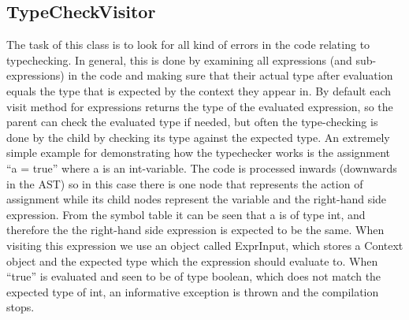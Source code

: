 \documentclass[paper=a4, fontsize=11pt]{scrartcl} %
\numberwithin{equation}{section} %
\numberwithin{figure}{section} %
\numberwithin{table}{section} %
\begin{document}
\subsection{TypeCheckVisitor}
The task of this class is to look for all kind of errors in the code relating to typechecking. In general, this is done by examining all expressions (and sub-expressions) in the code and making sure that their actual type after evaluation equals the type that is expected by the context they appear in. By default each visit method for expressions returns the type of the evaluated expression, so the parent can check the evaluated type if needed, but often the type-checking is done by the child by checking its type against the expected type. An extremely simple example for demonstrating how the typechecker works is the assignment “a = true” where a is an int-variable. The code is processed inwards (downwards in the AST) so in this case there is one node that represents the action of assignment while its child nodes represent the variable and the right-hand side expression. From the symbol table it can be seen that a is of type int, and therefore the the right-hand side expression is expected to be the same. When visiting this expression we use an object called ExprInput, which stores a Context object and the expected type which the expression should evaluate to. When “true” is evaluated and seen to be of type boolean, which does not match the expected type of int, an informative exception is thrown and the compilation stops.\\
\end{document}
